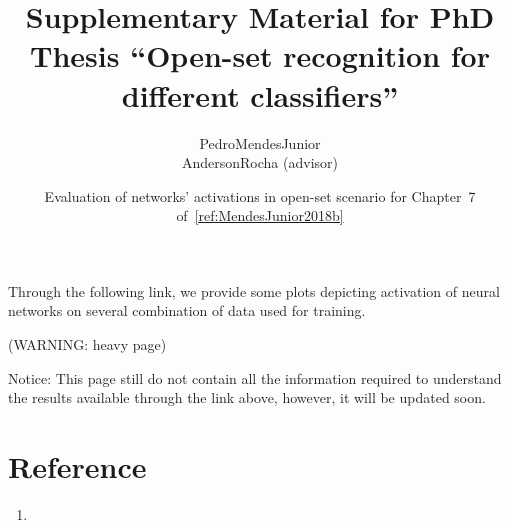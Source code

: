 

% 

\renewcommand\highlightauthorname[1]{#1}

\title{Supplementary Material for PhD Thesis ``Open-set recognition for different classifiers''}
\author{\gls{PedroMendesJunior}\\%
  \gls{AndersonRocha} (advisor)\\%
}
\date{Evaluation of networks' activations in open-set scenario for Chapter~7 of~\ref{ref:MendesJunior2018b}}



\maketitle


Through the following link, we provide some plots depicting activation of neural networks on several combination of data used for training.

\begin{center}
   (WARNING: heavy page)
\end{center}

Notice: This page still do not contain all the information required to understand the results available through the link above, however, it will be updated soon.

\section*{Reference}

\begin{enumerate}
\item{}
\end{enumerate}




